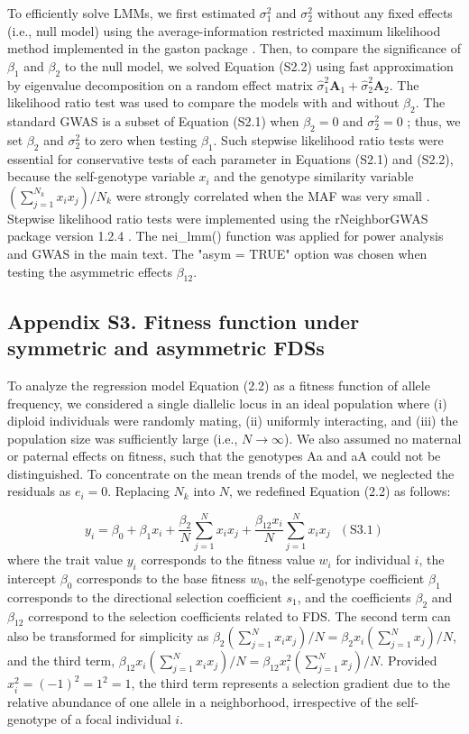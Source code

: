 \documentclass[12pt,]{article}
\begin{document}
To efficiently solve LMMs, we first estimated $\sigma^2_1$ and $\sigma^2_2$ without any fixed effects (i.e., null model) using the average-information restricted maximum likelihood method implemented in the gaston package \citep{R_gaston}. Then, to compare the significance of $\beta_1$ and $\beta_2$ to the null model, we solved Equation (S2.2) using fast approximation by eigenvalue decomposition on a random effect matrix $\hat{\sigma}^2_1\mathbf{A}_1+\hat{\sigma}^2_2\mathbf{A}_2$. The likelihood ratio test was used to compare the models with and without $\beta_2$. The standard GWAS is a subset of Equation (S2.1) when $\beta_2=0$ and $\sigma^2_2=0$ \citep{sato2019neighbor}; thus, we set $\beta_2$ and $\sigma^2_2$ to zero when testing $\beta_1$. Such stepwise likelihood ratio tests were essential for conservative tests of each parameter in Equations (S2.1) and (S2.2), because the self-genotype variable $x_i$ and the genotype similarity variable $(\sum^{N_{k}}_{j=1}{x_ix_j})/N_k$ were strongly correlated when the MAF was very small \citep{sato2019neighbor}. Stepwise likelihood ratio tests were implemented using the rNeighborGWAS package version 1.2.4 \citep{sato2019neighbor}. The nei\_lmm() function was applied for power analysis and GWAS in the main text. The "asym = TRUE" option was chosen when testing the asymmetric effects $\beta_{12}$.


\medskip
\subsection*{Appendix S3. Fitness function under symmetric and asymmetric FDSs}
To analyze the regression model Equation (2.2) as a fitness function of allele frequency, we considered a single diallelic locus in an ideal population where (i) diploid individuals were randomly mating, (ii) uniformly interacting, and (iii) the population size was sufficiently large (i.e., $N \to \infty$). We also assumed no maternal or paternal effects on fitness, such that the genotypes Aa and aA could not be distinguished. To concentrate on the mean trends of the model, we neglected the residuals as $e_i = 0$. Replacing $N_{k}$ into $N$, we redefined Equation (2.2) as follows:

$$y_i = \beta_0 + \beta_1x_i + \frac{\beta_2}{N}\sum^{N}_{j=1}{x_ix_j} + \frac{\beta_{12}x_i}{N}\sum^{N}_{j=1}{x_ix_j}~~~(\mathrm{S3.1})$$
where the trait value $y_i$ corresponds to the fitness value $w_i$ for individual $i$, the intercept $\beta_0$ corresponds to the base fitness $w_0$, the self-genotype coefficient $\beta_1$ corresponds to the directional selection coefficient $s_1$, and the coefficients $\beta_2$ and $\beta_{12}$ correspond to the selection coefficients related to FDS. The second term can also be transformed for simplicity as $\beta_2(\sum^{N}_{j=1}x_i x_j)/N = \beta_2x_i(\sum^{N}_{j=1}x_j)/N$, and the third term, $\beta_{12}x_i(\sum^{N}_{j=1}x_i x_j)/N = \beta_{12}x^2_i(\sum^{N}_{j=1}x_j)/N$. Provided $x^2_i=(-1)^2=1^2=1$, the third term represents a selection gradient due to the relative abundance of one allele in a neighborhood, irrespective of the self-genotype of a focal individual $i$.
\end{document}
